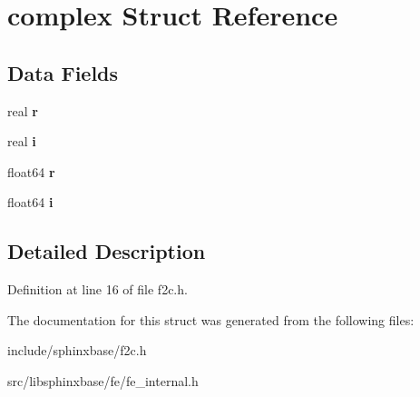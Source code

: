 \section{complex \-Struct \-Reference}
\label{structcomplex}
\subsection*{\-Data \-Fields}
\begin{DoxyCompactItemize}
\item 
real {\bfseries r}\label{structcomplex_a03cba9844d71e49f4ddf7c5f3dd45822}

\item 
real {\bfseries i}\label{structcomplex_aa55283d87e8d89c794bac746fb11d524}

\item 
float64 {\bfseries r}\label{structcomplex_ab074de5c97259ff1d0c495e8ff3fdc89}

\item 
float64 {\bfseries i}\label{structcomplex_a94348f29e0746c91409bf02b270ec5d0}

\end{DoxyCompactItemize}


\subsection{\-Detailed \-Description}


\-Definition at line 16 of file f2c.\-h.



\-The documentation for this struct was generated from the following files\-:\begin{DoxyCompactItemize}
\item 
include/sphinxbase/f2c.\-h\item 
src/libsphinxbase/fe/fe\-\_\-internal.\-h\end{DoxyCompactItemize}
